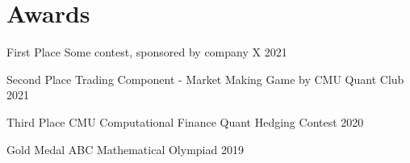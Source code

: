 \section{Awards}
\resumeSectionStart

\awardsTableStart

    \awardsItem
        {First Place}
        {Some contest, sponsored by company X}
        {2021}

    \awardsItem
        {Second Place}
        {Trading Component - Market Making Game by CMU Quant Club}
        {2021}

    \awardsItem
        {Third Place}
        {CMU Computational Finance Quant Hedging Contest}
        {2020}

    \awardsItem
        {Gold Medal}
        {ABC Mathematical Olympiad}
        {2019}

\awardsTableEnd

\resumeSectionEnd
